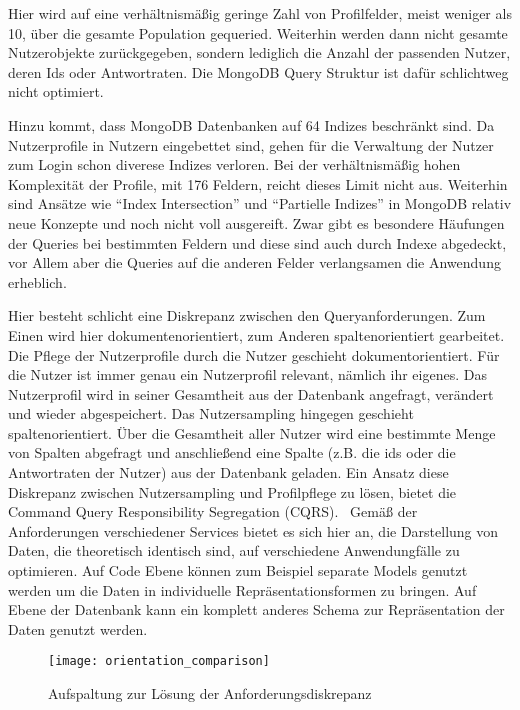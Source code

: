 Hier wird auf eine verhältnismäßig geringe Zahl von Profilfelder, meist weniger als 10, über die gesamte Population gequeried. Weiterhin werden dann nicht gesamte Nutzerobjekte zurückgegeben, sondern lediglich die Anzahl der passenden Nutzer, deren Ids oder Antwortraten. Die MongoDB Query Struktur ist dafür schlichtweg nicht optimiert.

Hinzu kommt, dass MongoDB Datenbanken auf 64 Indizes beschränkt sind\cite{mongo:indexlimit}. Da Nutzerprofile in Nutzern eingebettet sind, gehen für die Verwaltung der Nutzer zum Login schon diverese Indizes verloren. Bei der verhältnismäßig hohen Komplexität der Profile, mit 176 Feldern, reicht dieses Limit nicht aus.
Weiterhin sind Ansätze wie ``Index Intersection'' und ``Partielle Indizes'' in MongoDB relativ neue Konzepte und noch nicht voll ausgereift\cite{mongo:indexintersection}\cite{mongo:partialindexes}.
Zwar gibt es besondere Häufungen der Queries bei bestimmten Feldern und diese sind auch durch Indexe abgedeckt, vor Allem aber die Queries auf die anderen Felder verlangsamen die Anwendung erheblich.

Hier besteht schlicht eine Diskrepanz zwischen den Queryanforderungen. Zum Einen wird hier dokumentenorientiert, zum Anderen spaltenorientiert gearbeitet.
Die Pflege der Nutzerprofile durch die Nutzer geschieht dokumentorientiert. Für die Nutzer ist immer genau ein Nutzerprofil relevant, nämlich ihr eigenes. Das Nutzerprofil wird in seiner Gesamtheit aus der Datenbank angefragt, verändert und wieder abgespeichert.
Das Nutzersampling hingegen geschieht spaltenorientiert. Über die Gesamtheit aller Nutzer wird eine bestimmte Menge von Spalten abgefragt und anschließend eine Spalte (z.B. die ids oder die Antwortraten der Nutzer) aus der Datenbank geladen.
Ein Ansatz diese Diskrepanz zwischen Nutzersampling und Profilpflege zu lösen, bietet die Command Query Responsibility Segregation (CQRS).~\cite[][]{fowler:cqrs} Gemäß der Anforderungen verschiedener Services bietet es sich hier an, die Darstellung von Daten, die theoretisch identisch sind, auf verschiedene Anwendungfälle zu optimieren. Auf Code Ebene können zum Beispiel separate Models genutzt werden um die Daten in individuelle Repräsentationsformen zu bringen. Auf Ebene der Datenbank kann ein komplett anderes Schema zur Repräsentation der Daten genutzt werden.

\begin{figure}[!ht]
    \centering
    \caption{Aufspaltung zur Lösung der Anforderungsdiskrepanz}
    \label{fig:orientationsplit}
    \texttt{[image: orientation\_comparison]}
\end{figure}


